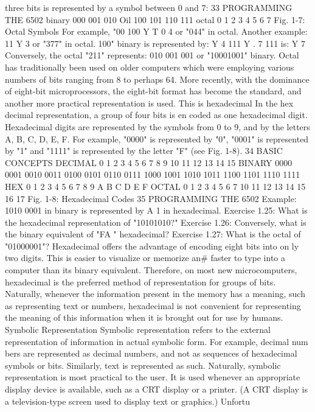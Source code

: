 three bits is represented by a symbol between 0 and 7:
33
PROGRAMMING THE 6502
binary
000
001
010
Oil
100
101
110
111
octal
0
1
2
3
4
5
6
7
Fig. 1-7: Octal Symbols
For example, "00 100
Y T
0 4
or "044" in octal.
Another example: 11
Y
3
or "377" in octal.
100" binary is represented by:
Y
4
111
Y
. 7
111 is:
Y
7
Conversely, the octal "211" represents:
010 001 001
or "10001001" binary.
Octal has traditionally been used on older computers which were
employing various numbers of bits ranging from 8 to perhaps 64.
More recently, with the dominance of eight-bit microprocessors,
the eight-bit format has become the standard, and another more
practical representation is used. This is hexadecimal
In the hex decimal representation, a group of four bits is en
coded as one hexadecimal digit. Hexadecimal digits are
represented by the symbols from 0 to 9, and by the letters A, B, C,
D, E, F. For example, "0000" is represented by "0", "0001" is
represented by "1" and "1111" is represented by the letter "F"
(see Fig. 1-8).
34
BASIC CONCEPTS
DECIMAL
0
1
2
3
4
5
6
7
8
9
10
11
12
13
14
15
BINARY
0000
0001
0010
0011
0100
0101
0110
0111
1000
1001
1010
1011
1100
1101
1110
1111
HEX
0
1
2
3
4
5
6
7
8
9
A
B
C
D
E
F
OCTAL
0
1
2
3
4
5
6
7
10
11
12
13
14
15
16
17
Fig. 1-8: Hexadecimal Codes
35
PROGRAMMING THE 6502
Example: 1010 0001 in binary is represented by
A 1 in hexadecimal.
Exercise 1.25: What is the hexadecimal representation of
"10101010?"
Exercise 1.26: Conversely, what is the binary equivalent of "FA "
hexadecimal?
Exercise 1.27: What is the octal of "01000001"?
Hexadecimal offers the advantage of encoding eight bits into on
ly two digits. This is easier to visualize or memorize an# faster to
type into a computer than its binary equivalent. Therefore, on
most new microcomputers, hexadecimal is the preferred method of
representation for groups of bits.
Naturally, whenever the information present in the memory has
a meaning, such as representing text or numbers, hexadecimal is
not convenient for representing the meaning of this information
when it is brought out for use by humans.
Symbolic Representation
Symbolic representation refers to the external representation of
information in actual symbolic form. For example, decimal num
bers are represented as decimal numbers, and not as sequences of
hexadecimal symbols or bits. Similarly, text is represented as
such. Naturally, symbolic representation is most practical to the
user. It is used whenever an appropriate display device is
available, such as a CRT display or a printer. (A CRT display is a
television-type screen used to display text or graphics.) Unfortu
